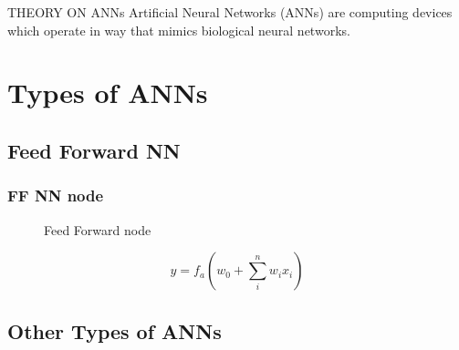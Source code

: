 THEORY ON ANNs
Artificial Neural Networks (ANNs) are computing devices which operate in way that mimics biological neural networks.
\section{Types of ANNs}
\subsection{Feed Forward NN}
\subsubsection{FF NN node}
\begin{figure}[ht]
	\centering
	
	\caption{Feed Forward node}
	\label{fig:FF_node}
\end{figure}
\begin{equation}
y = f_a \left(  w_0 + \sum_i^n w_i x_i \right)
\label{eq:node_function}
\end{equation}
\subsection{Other Types of ANNs}